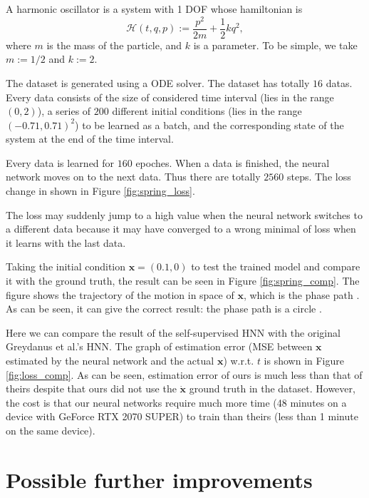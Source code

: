 \documentclass{article}
\begin{document}
A harmonic oscillator is a system with 1 DOF whose hamiltonian is \cite[p. 157]{landau1976mechanics}
\begin{equation*}
	\mathcal H\left(t,q,p\right):=\frac{p^2}{2m}+\frac12kq^2,
\end{equation*}
where $m$ is the mass of the particle, and $k$ is a parameter.
To be simple, we take $m:=1/2$ and $k:=2$.

The dataset is generated using a ODE solver.
The dataset has totally $16$ datas.
Every data consists of the size of considered time interval
(lies in the range $\left(0,2\right)$),
a series of $200$ different initial conditions
(lies in the range $\left(-0.71,0.71\right)^2$)
to be learned as a batch,
and the corresponding state of the system at the end of the time interval.

Every data is learned for $160$ epoches.
When a data is finished, the neural network moves on to the next data.
Thus there are totally $2560$ steps.
The loss change in shown in Figure \ref{fig:spring_loss}.

The loss may suddenly jump to a high value when the neural network switches to a different data
because it may have converged to a wrong minimal of loss when it learns with the last data.

Taking the initial condition $\mathbf x=\left(0.1,0\right)$
to test the trained model and compare it with the ground truth,
the result can be seen in Figure \ref{fig:spring_comp}.
The figure shows the trajectory of the motion in space of $\mathbf x$,
which is the phase path \cite[p. 146]{landau1976mechanics}\cite[p. 68]{arnold1989mathmech}.
As can be seen, it can give the correct result:
the phase path is a circle \cite[p. 17]{arnold1989mathmech}.

Here we can compare the result of the self-supervised HNN with the original Greydanus et al.'s HNN.
The graph of estimation error (MSE between $\mathbf x$ estimated by the neural network and the actual $\mathbf x$) w.r.t. $t$ is shown in Figure \ref{fig:loss_comp}.
As can be seen, estimation error of ours is much less than that of theirs
despite that ours did not use the $\dot{\mathbf x}$ ground truth in the dataset.
However, the cost is that our neural networks require much more time
(48 minutes on a device with GeForce RTX 2070 SUPER) to train
than theirs (less than 1 minute on the same device).

\section{Possible further improvements}
\end{document}
